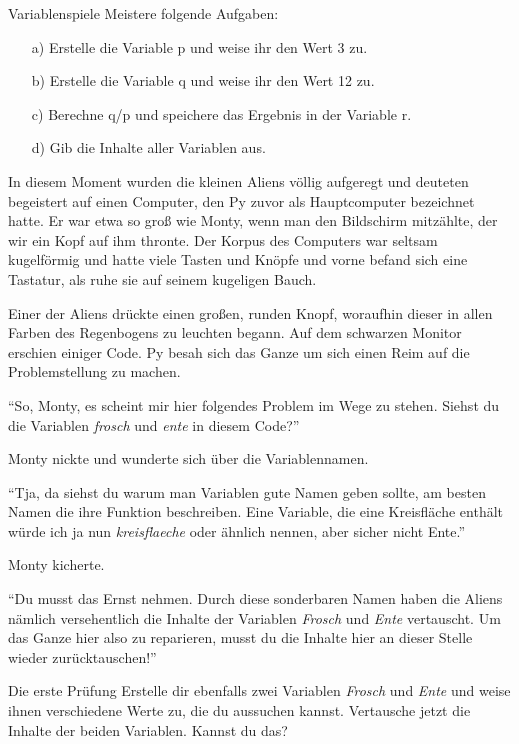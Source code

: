 \documentclass[a5paper,12pt,twoside,openright]{scrbook}
\begin{document}
\begin{aufgabe}{Variablenspiele}
 Meistere folgende Aufgaben:
 \begin{itemize}
  \item[a)] Erstelle die Variable p und weise ihr den Wert 3 zu.
  \item[b)] Erstelle die Variable q und weise ihr den Wert 12 zu.
  \item[c)] Berechne q/p und speichere das Ergebnis in der Variable r.
  \item[d)] Gib die Inhalte aller Variablen aus.
 \end{itemize}
\end{aufgabe}

In diesem Moment wurden die kleinen Aliens v\"ollig aufgeregt und deuteten begeistert auf
einen Computer, den Py zuvor als Hauptcomputer bezeichnet hatte.
Er war etwa so groß wie Monty, wenn man den Bildschirm mitz\"ahlte, der 
wir ein Kopf auf ihm thronte.
Der Korpus des Computers war seltsam kugelförmig und hatte viele Tasten und Kn\"opfe 
und vorne befand sich eine Tastatur, als ruhe sie auf seinem kugeligen Bauch.

Einer der Aliens dr\"uckte einen großen, runden Knopf, 
woraufhin dieser in allen Farben des Regenbogens zu leuchten begann.
Auf dem schwarzen Monitor erschien einiger Code.
Py besah sich das Ganze um sich einen Reim auf die Problemstellung zu machen.

"`So, Monty, es scheint mir hier folgendes Problem im Wege zu stehen. 
Siehst du die Variablen \textit{frosch} und \textit{ente} in diesem Code?"'

Monty nickte und wunderte sich \"uber die Variablennamen.

"`Tja, da siehst du warum man Variablen gute Namen geben sollte, am besten Namen die ihre Funktion beschreiben. 
Eine Variable, die eine Kreisfl\"ache enth\"alt w\"urde ich ja nun \textit{kreisflaeche} oder \"ahnlich nennen, aber sicher nicht Ente."'

Monty kicherte.

"`Du musst das Ernst nehmen. Durch diese sonderbaren Namen haben die Aliens n\"amlich versehentlich die Inhalte der Variablen 
\textit{Frosch} und \textit{Ente} vertauscht. 
Um das Ganze hier also zu reparieren, musst du die Inhalte hier an dieser Stelle wieder zur\"ucktauschen!"'

\begin{aufgabe}{Die erste Pr\"ufung}
 Erstelle dir ebenfalls zwei Variablen \textit{Frosch} und \textit{Ente} und weise ihnen 
 verschiedene Werte zu, die du aussuchen kannst.
 Vertausche jetzt die Inhalte der beiden Variablen. Kannst du das?
\end{aufgabe}
\end{document}
